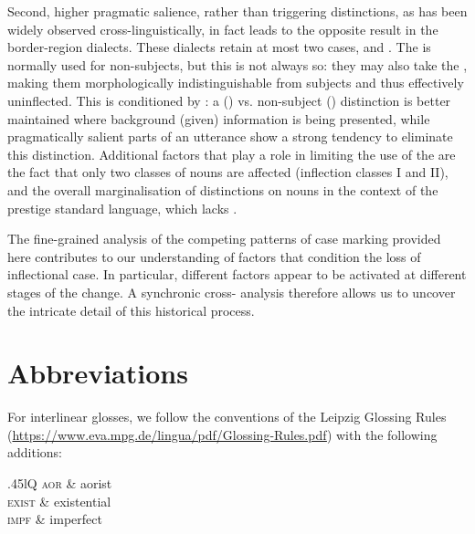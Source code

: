 \documentclass[output=paper,colorlinks,citecolor=brown]{langscibook}
\begin{document}
Second, higher pragmatic salience, rather than triggering  distinctions, as has been widely observed cross-linguistically, in fact leads to the opposite result in the  border-region dialects. These dialects retain at most two cases,  and . The  is normally used for non-subjects, but this is not always so: they may also take the , making them morphologically indistinguishable from subjects and thus effectively uninflected. This  is conditioned by : a  () vs. non-subject () distinction is better maintained where background (given) information is being presented, while pragmatically salient parts of an utterance show a strong tendency to eliminate this distinction. Additional factors that play a role in limiting the use of the  are the fact that only two classes of nouns are affected (inflection classes I and II), and the overall marginalisation of  distinctions on nouns in the context of the prestige standard language, which lacks  .

The fine-grained analysis of the competing patterns of case marking provided here contributes to our understanding of factors that condition the loss of inflectional case. In particular, different factors appear to be activated at different stages of the change. A synchronic cross- analysis therefore allows us to uncover the intricate detail of this historical process.

 
 
\section*{Abbreviations}
For interlinear glosses, we follow the conventions of the Leipzig Glossing Rules (\url{https://www.eva.mpg.de/lingua/pdf/Glossing-Rules.pdf}) with the following additions:

\medskip

	\begin{tabularx}{.45\textwidth}{lQ}
	\textsc{aor} & aorist \\
	\textsc{exist} & existential \\
	\textsc{impf} & imperfect \\
	\end{tabularx}
\end{document}
